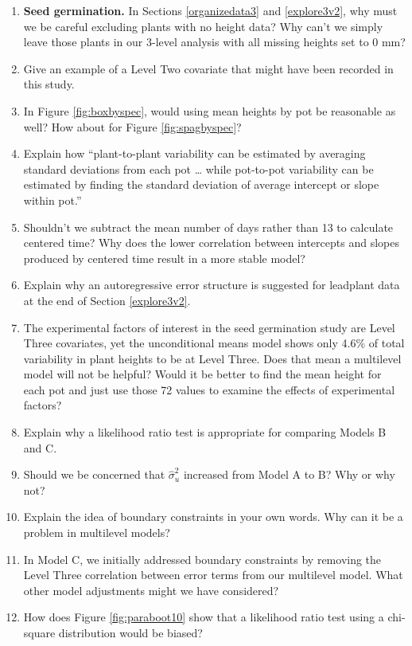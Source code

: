 \documentclass[
]{krantz}
\begin{document}
\begin{enumerate}
\def\labelenumi{\arabic{enumi}.}
\item
  \textbf{Seed germination.} In Sections \ref{organizedata3} and \ref{explore3v2}, why must we be careful excluding plants with no height data? Why can't we simply leave those plants in our 3-level analysis with all missing heights set to 0 mm?
\item
  Give an example of a Level Two covariate that might have been recorded in this study.
\item
  In Figure \ref{fig:boxbyspec}, would using mean heights by pot be reasonable as well? How about for Figure \ref{fig:spagbyspec}?
\item
  Explain how ``plant-to-plant variability can be estimated by averaging standard deviations from each pot \ldots{} while pot-to-pot variability can be estimated by finding the standard deviation of average intercept or slope within pot.''
\item
  Shouldn't we subtract the mean number of days rather than 13 to calculate centered time? Why does the lower correlation between intercepts and slopes produced by centered time result in a more stable model?
\item
  Explain why an autoregressive error structure is suggested for leadplant data at the end of Section \ref{explore3v2}.
\item
  The experimental factors of interest in the seed germination study are Level Three covariates, yet the unconditional means model shows only 4.6\% of total variability in plant heights to be at Level Three. Does that mean a multilevel model will not be helpful? Would it be better to find the mean height for each pot and just use those 72 values to examine the effects of experimental factors?
\item
  Explain why a likelihood ratio test is appropriate for comparing Models B and C.
\item
  Should we be concerned that \(\hat{\sigma}_{u}^{2}\) increased from Model A to B? Why or why not?
\item
  Explain the idea of boundary constraints in your own words. Why can it be a problem in multilevel models?
\item
  In Model C, we initially addressed boundary constraints by removing the Level Three correlation between error terms from our multilevel model. What other model adjustments might we have considered?
\item
  How does Figure \ref{fig:paraboot10} show that a likelihood ratio test using a chi-square distribution would be biased?

\end{enumerate}
\end{document}
